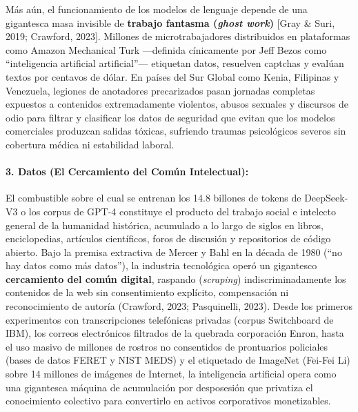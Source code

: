 Más aún, el funcionamiento de los modelos de lenguaje depende de una gigantesca masa invisible de \textbf{trabajo fantasma (\textit{ghost work})} [Gray \& Suri, 2019; Crawford, 2023]. Millones de microtrabajadores distribuidos en plataformas como Amazon Mechanical Turk ---definida cínicamente por Jeff Bezos como ``inteligencia artificial artificial''--- etiquetan datos, resuelven captchas y evalúan textos por centavos de dólar. En países del Sur Global como Kenia, Filipinas y Venezuela, legiones de anotadores precarizados pasan jornadas completas expuestos a contenidos extremadamente violentos, abusos sexuales y discursos de odio para filtrar y clasificar los datos de seguridad que evitan que los modelos comerciales produzcan salidas tóxicas, sufriendo traumas psicológicos severos sin cobertura médica ni estabilidad laboral.

\paragraph{3. Datos (El Cercamiento del Común Intelectual):}
El combustible sobre el cual se entrenan los 14.8 billones de tokens de DeepSeek-V3 o los corpus de GPT-4 constituye el producto del trabajo social e intelecto general de la humanidad histórica, acumulado a lo largo de siglos en libros, enciclopedias, artículos científicos, foros de discusión y repositorios de código abierto. Bajo la premisa extractiva de Mercer y Bahl en la década de 1980 (``no hay datos como más datos''), la industria tecnológica operó un gigantesco \textbf{cercamiento del común digital}, raspando (\textit{scraping}) indiscriminadamente los contenidos de la web sin consentimiento explícito, compensación ni reconocimiento de autoría (Crawford, 2023; Pasquinelli, 2023). Desde los primeros experimentos con transcripciones telefónicas privadas (corpus Switchboard de IBM), los correos electrónicos filtrados de la quebrada corporación Enron, hasta el uso masivo de millones de rostros no consentidos de prontuarios policiales (bases de datos FERET y NIST MEDS) y el etiquetado de ImageNet (Fei-Fei Li) sobre 14 millones de imágenes de Internet, la inteligencia artificial opera como una gigantesca máquina de acumulación por desposesión que privatiza el conocimiento colectivo para convertirlo en activos corporativos monetizables.

\newpage


